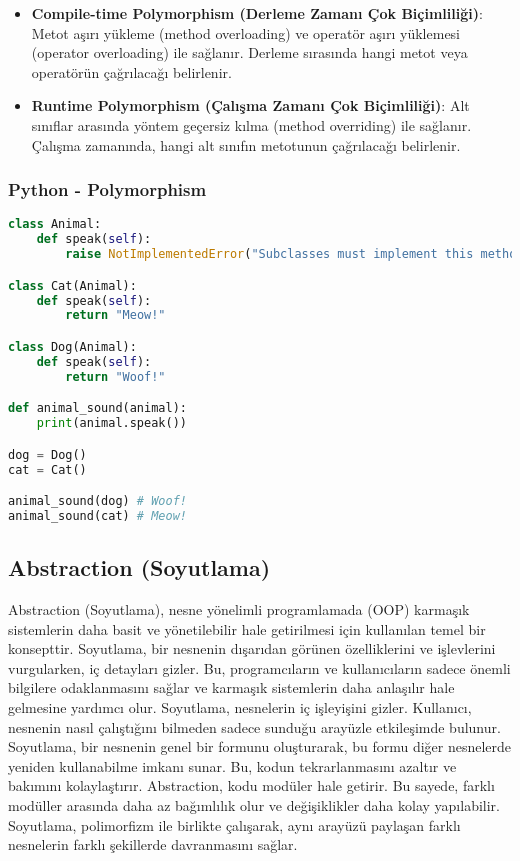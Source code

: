 \begin{itemize}
    \item \textbf{Compile-time Polymorphism (Derleme Zamanı Çok Biçimliliği)}: Metot aşırı yükleme (method overloading) ve operatör aşırı yüklemesi (operator overloading) ile sağlanır. Derleme sırasında hangi metot veya operatörün çağrılacağı belirlenir.
    \item \textbf{Runtime Polymorphism (Çalışma Zamanı Çok Biçimliliği)}: Alt sınıflar arasında yöntem geçersiz kılma (method overriding) ile sağlanır. Çalışma zamanında, hangi alt sınıfın metotunun çağrılacağı belirlenir.
\end{itemize}

\subsubsection{Python - Polymorphism}

\begin{lstlisting}[language=Python]
class Animal:
    def speak(self):
        raise NotImplementedError("Subclasses must implement this method.")

class Cat(Animal):
    def speak(self):
        return "Meow!"

class Dog(Animal):
    def speak(self):
        return "Woof!"

def animal_sound(animal):
    print(animal.speak())

dog = Dog()
cat = Cat()

animal_sound(dog) # Woof!
animal_sound(cat) # Meow!
\end{lstlisting}

\newpage

\subsection{Abstraction (Soyutlama)}

Abstraction (Soyutlama), nesne yönelimli programlamada (OOP) karmaşık sistemlerin daha basit ve yönetilebilir hale getirilmesi için kullanılan temel bir konsepttir. Soyutlama, bir nesnenin dışarıdan görünen özelliklerini ve işlevlerini vurgularken, iç detayları gizler. Bu, programcıların ve kullanıcıların sadece önemli bilgilere odaklanmasını sağlar ve karmaşık sistemlerin daha anlaşılır hale gelmesine yardımcı olur. Soyutlama, nesnelerin iç işleyişini gizler. Kullanıcı, nesnenin nasıl çalıştığını bilmeden sadece sunduğu arayüzle etkileşimde bulunur. Soyutlama, bir nesnenin genel bir formunu oluşturarak, bu formu diğer nesnelerde yeniden kullanabilme imkanı sunar. Bu, kodun tekrarlanmasını azaltır ve bakımını kolaylaştırır. Abstraction, kodu modüler hale getirir. Bu sayede, farklı modüller arasında daha az bağımlılık olur ve değişiklikler daha kolay yapılabilir. Soyutlama, polimorfizm ile birlikte çalışarak, aynı arayüzü paylaşan farklı nesnelerin farklı şekillerde davranmasını sağlar.

